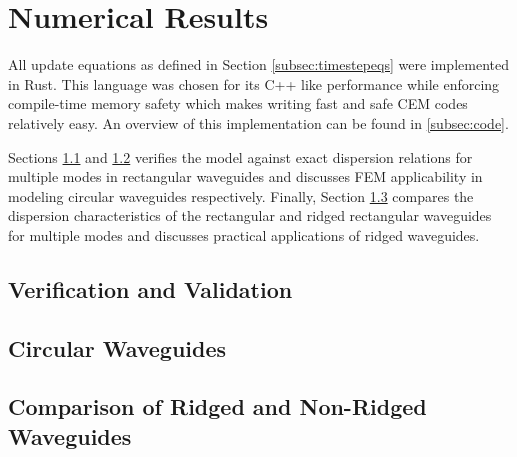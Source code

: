 \section{Numerical Results}
\label{sec:numres} 
All update equations as defined in Section \ref{subsec:timestepeqs} were implemented in Rust. This language was chosen for its C++ like performance while enforcing compile-time memory safety which makes writing fast and safe CEM codes relatively easy. An overview of this implementation can be found in \ref{subsec:code}.

Sections \ref{subsec:vv} and \ref{subsec:circ_guides} verifies the model against exact dispersion relations for multiple modes in rectangular waveguides and discusses FEM applicability in modeling circular waveguides respectively. Finally, Section \ref{subsec:rid_guides} compares the dispersion characteristics of the rectangular and ridged rectangular waveguides for multiple modes and discusses practical applications of ridged waveguides.

\subsection{Verification and Validation}
\label{subsec:vv}


\subsection{Circular Waveguides}
\label{subsec:circ_guides}

\subsection{Comparison of Ridged and Non-Ridged Waveguides}
\label{subsec:rid_guides}
